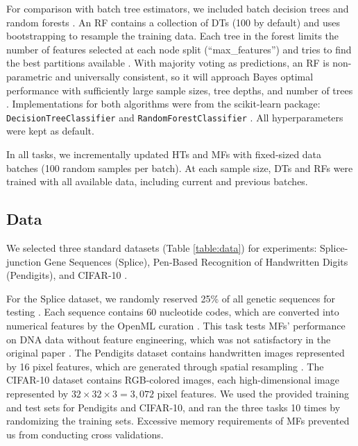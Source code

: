 For comparison with batch tree estimators, we included batch decision trees and random forests \citep{breiman_random_2001}. An RF contains a collection of DTs (100 by default) and uses bootstrapping to resample the training data. Each tree in the forest limits the number of features selected at each node split (``max\_features'') and tries to find the best partitions available \citep{breiman_random_2001}.
With majority voting as predictions, an RF is non-parametric and universally consistent, so it will approach Bayes optimal performance with sufficiently large sample sizes, tree depths, and number of trees \citep{liaw_classification_2002, biau_consistency_2008}.
Implementations for both algorithms were from the scikit-learn package: \texttt{DecisionTreeClassifier} and \texttt{RandomForestClassifier} \citep{pedregosa_scikit-learn_2011}. All hyperparameters were kept as default.

In all tasks, we incrementally updated HTs and MFs with fixed-sized data batches (100 random samples per batch). At each sample size, DTs and RFs were trained with all available data, including current and previous batches. 

\subsection{Data}
We selected three standard datasets (Table \ref{table:data}) for experiments: Splice-junction Gene Sequences (Splice), Pen-Based Recognition of Handwritten Digits (Pendigits), and CIFAR-10 \citep{towell_molecular_1991, alpaydin_pen-based_1998, krizhevsky_learning_2012, lavanya_handwritten_2017}.

For the Splice dataset, we randomly reserved 25\% of all genetic sequences for testing \citep{rampone_splice-junction_1998, sarkar_splice_2020}. Each sequence contains 60 nucleotide codes, which are converted into numerical features by the OpenML curation \citep{feurer_openml-python_2019}. This task tests MFs' performance on DNA data without feature engineering, which was not satisfactory in the original paper \cite{lakshminarayanan_mondrian_2014}. 
The Pendigits dataset contains handwritten images represented by 16 pixel features, which are generated through spatial resampling \citep{alimoglu_methods_1996}.
The CIFAR-10 dataset contains RGB-colored images, each high-dimensional image represented by $32 \times 32 \times 3 = 3,072$ pixel features. We used the provided training and test sets for Pendigits and CIFAR-10, and ran the three tasks 10 times by randomizing the training sets. Excessive memory requirements of MFs prevented us from conducting cross validations.

